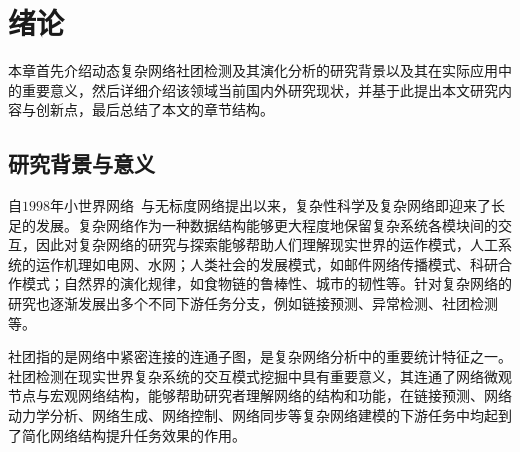 
\baselineskip 20pt

\chapter{绪论}
\label{chap:1}

本章首先介绍动态复杂网络社团检测及其演化分析的研究背景以及其在实际应用中的重要意义，然后详细介绍该领域当前国内外研究现状，并基于此提出本文研究内容与创新点，最后总结了本文的章节结构。
 


\section{研究背景与意义}




自$1998$年小世界网络~\cite{watts1998collective}与无标度网络\cite{albert1999diameter}提出以来，复杂性科学及复杂网络即迎来了长足的发展。复杂网络作为一种数据结构能够更大程度地保留复杂系统各模块间的交互，因此对复杂网络的研究与探索能够帮助人们理解现实世界的运作模式，人工系统的运作机理如电网\cite{NEURIPS2024_c7caf017}、水网\cite{orgovanyi2025geocoding}；人类社会的发展模式，如邮件网络传播模式\cite{barnes2024temporal}、科研合作模式\cite{mariani2024collective}；自然界的演化规律，如食物链的鲁棒性\cite{sanders2024ecosystem}、城市的韧性\cite{ZHANG2024114379}等。针对复杂网络的研究也逐渐发展出多个不同下游任务分支，例如链接预测\cite{NEURIPS2024_25ead0ef}、异常检测\cite{10535312}、社团检测等\cite{kumar2024community}。


社团指的是网络中紧密连接的连通子图，是复杂网络分析中的重要统计特征之一。社团检测在现实世界复杂系统的交互模式挖掘中具有重要意义，其连通了网络微观节点与宏观网络结构，能够帮助研究者理解网络的结构和功能，在链接预测、网络动力学分析、网络生成、网络控制、网络同步等复杂网络建模的下游任务中均起到了简化网络结构提升任务效果的作用\cite{kumar2024community,fortunato2016community}。

